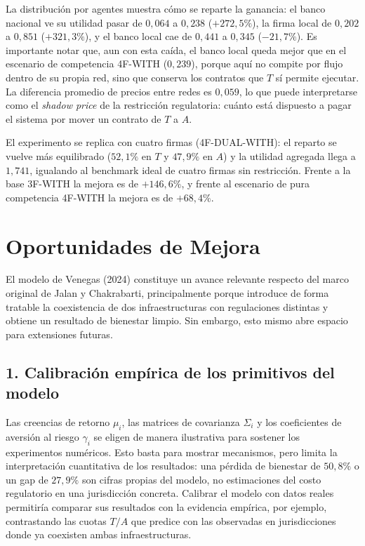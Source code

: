 \documentclass[12pt,a4paper]{article}
\begin{document}
La distribución por agentes muestra cómo se reparte la ganancia: el banco nacional ve su
utilidad pasar de $0{,}064$ a $0{,}238$ ($+272{,}5\%$), la firma local de $0{,}202$ a $0{,}851$
($+321{,}3\%$), y el banco local cae de $0{,}441$ a $0{,}345$ ($-21{,}7\%$). Es importante notar
que, aun con esta caída, el banco local queda mejor que en el escenario de competencia
4F-WITH ($0{,}239$), porque aquí no compite por flujo dentro de su propia red, sino que conserva
los contratos que $T$ sí permite ejecutar. La diferencia promedio de precios entre redes es
$0{,}059$, lo que puede interpretarse como el \textit{shadow price} de la restricción
regulatoria: cuánto está dispuesto a pagar el sistema por mover un contrato de $T$ a $A$.

El experimento se replica con cuatro firmas (4F-DUAL-WITH): el reparto se vuelve más
equilibrado ($52{,}1\%$ en $T$ y $47{,}9\%$ en $A$) y la utilidad agregada llega a $1{,}741$,
igualando al benchmark ideal de cuatro firmas sin restricción. Frente a la base 3F-WITH la
mejora es de $+146{,}6\%$, y frente al escenario de pura competencia 4F-WITH la mejora es de
$+68{,}4\%$.


\section*{Oportunidades de Mejora}

El modelo de Venegas (2024) constituye un avance relevante respecto del marco original de Jalan
y Chakrabarti, principalmente porque introduce de forma tratable la coexistencia de dos
infraestructuras con regulaciones distintas y obtiene un resultado de bienestar limpio. Sin
embargo, esto mismo abre espacio para extensiones futuras.

\subsection*{1. Calibración empírica de los primitivos del modelo}

Las creencias de retorno $\mu_i$, las matrices de covarianza $\Sigma_i$ y los coeficientes de
aversión al riesgo $\gamma_i$ se eligen de manera ilustrativa para sostener los experimentos
numéricos. Esto basta para mostrar mecanismos, pero limita la interpretación cuantitativa de
los resultados: una pérdida de bienestar de $50{,}8\%$ o un gap de $27{,}9\%$ son cifras propias
del modelo, no estimaciones del costo regulatorio en una jurisdicción concreta. Calibrar el
modelo con datos reales permitiría comparar sus resultados con la evidencia empírica, por
ejemplo, contrastando las cuotas $T/A$ que predice con las observadas en jurisdicciones donde
ya coexisten ambas infraestructuras.
\end{document}
